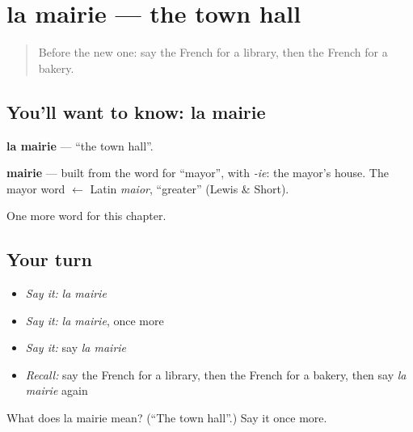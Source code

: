 \section[la mairie]{la mairie — the town hall}

\label{lesson:FR-C102-mairie}



\begin{quote}
Before the new one: say the French for a library, then the French for a bakery.
\end{quote}

\subsection*{You'll want to know: la mairie}
\textbf{la mairie} — \textquotedblleft{}the town hall\textquotedblright{}.

\begin{cousinweb}
\textbf{mairie} — built from the word for \textquotedblleft{}mayor\textquotedblright{}, with \emph{-ie}: the mayor's house. The mayor word $\leftarrow$ Latin \emph{maior}, \textquotedblleft{}greater\textquotedblright{} (Lewis \& Short).
\end{cousinweb}

\begin{grammarlens}[title={What you've built}]
One more word for this chapter.
\end{grammarlens}

\subsection*{Your turn}
\begin{itemize}
\raggedright
  \item \emph{Say it:} \emph{la mairie}
  \item \emph{Say it:} \emph{la mairie}, once more
  \item \emph{Say it:} say \emph{la mairie}
  \item \emph{Recall:} say the French for a library, then the French for a bakery, then say \emph{la mairie} again
\end{itemize}

\begin{tcolorbox}[breakable,colback=teal!4,colframe=teal!35!black,title={Before you move on}]
What does la mairie mean? (\textquotedblleft{}The town hall\textquotedblright{}.) Say it once more.
\end{tcolorbox}
